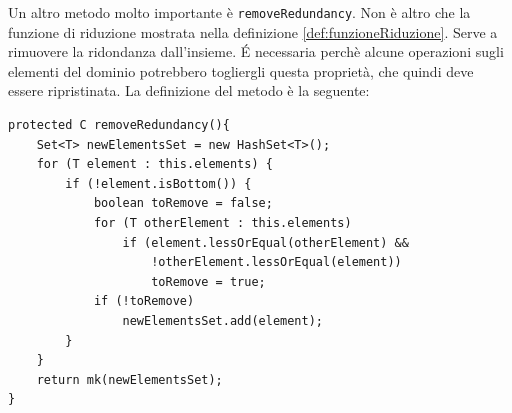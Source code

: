 Un altro metodo molto importante è \texttt{removeRedundancy}. Non è altro che la funzione di riduzione mostrata nella definizione \ref{def:funzioneRiduzione}. Serve a rimuovere la ridondanza dall'insieme. \'E necessaria perchè alcune operazioni sugli elementi del dominio potrebbero togliergli questa proprietà, che quindi deve essere ripristinata. La definizione del metodo è la seguente:
\begin{lstlisting}[belowskip=-1.1 \baselineskip]
protected C removeRedundancy(){
    Set<T> newElementsSet = new HashSet<T>();
    for (T element : this.elements) {
        if (!element.isBottom()) {
            boolean toRemove = false;
            for (T otherElement : this.elements)
                if (element.lessOrEqual(otherElement) && 
                    !otherElement.lessOrEqual(element))
                    toRemove = true;
            if (!toRemove)
                newElementsSet.add(element);
        }
    }
    return mk(newElementsSet);
}
\end{lstlisting}

